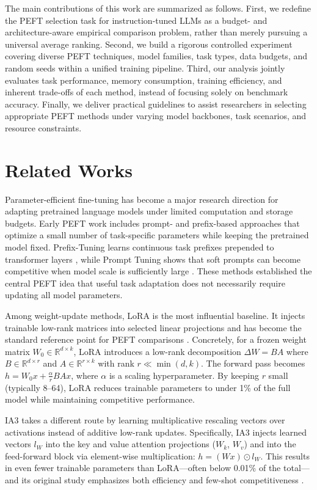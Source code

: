 \documentclass{article}
\begin{document}
The main contributions of this work are summarized as follows. First, we redefine the PEFT selection task for instruction-tuned LLMs as a budget- and architecture-aware empirical comparison problem, rather than merely pursuing a universal average ranking. Second, we build a rigorous controlled experiment covering diverse PEFT techniques, model families, task types, data budgets, and random seeds within a unified training pipeline. Third, our analysis jointly evaluates task performance, memory consumption, training efficiency, and inherent trade-offs of each method, instead of focusing solely on benchmark accuracy. Finally, we deliver practical guidelines to assist researchers in selecting appropriate PEFT methods under varying model backbones, task scenarios, and resource constraints.



\section{Related Works}

Parameter-efficient fine-tuning has become a major research direction for adapting pretrained language models under limited computation and storage budgets. Early PEFT work includes prompt- and prefix-based approaches that optimize a small number of task-specific parameters while keeping the pretrained model fixed. Prefix-Tuning learns continuous task prefixes prepended to transformer layers \cite{li2021prefix}, while Prompt Tuning shows that soft prompts can become competitive when model scale is sufficiently large \cite{lester2021power}. These methods established the central PEFT idea that useful task adaptation does not necessarily require updating all model parameters.

Among weight-update methods, LoRA is the most influential baseline. It injects trainable low-rank matrices into selected linear projections and has become the standard reference point for PEFT comparisons \cite{hu2022lora}. Concretely, for a frozen weight matrix $W_0 \in \mathbb{R}^{d \times k}$, LoRA introduces a low-rank decomposition $\Delta W = BA$ where $B \in \mathbb{R}^{d \times r}$ and $A \in \mathbb{R}^{r \times k}$ with rank $r \ll \min(d,k)$. The forward pass becomes $h = W_0 x + \frac{\alpha}{r} BA x$, where $\alpha$ is a scaling hyperparameter. By keeping $r$ small (typically 8--64), LoRA reduces trainable parameters to under 1\% of the full model while maintaining competitive performance.

IA3 takes a different route by learning multiplicative rescaling vectors over activations instead of additive low-rank updates. Specifically, IA3 injects learned vectors $l_W$ into the key and value attention projections ($W_k$, $W_v$) and into the feed-forward block via element-wise multiplication: $h = (W x) \odot l_W$. This results in even fewer trainable parameters than LoRA---often below 0.01\% of the total---and its original study emphasizes both efficiency and few-shot competitiveness \cite{liu2022ia3}.
\end{document}
